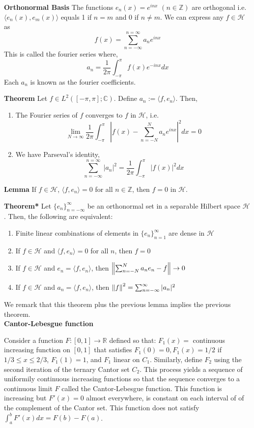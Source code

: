 \documentclass[6pt,landscape]{article}
\begin{document}
\begin{multicols*}{3}
\textbf{Orthonormal Basis} The functions $e_n(x) = e^{inx}$ $(n\in\mathbb{Z})$ are orthogonal i.e. $\langle e_n(x), e_m(x)\rangle$ equals 1 if $n=m$ and 0 if $n\neq m$. We can express any
$f\in\mathcal{H}$ as
\[ f(x) = \sum_{n=-\infty}^{n=\infty} a_ne^{inx} \]
This is called the fourier series where,
\[ a_n = \frac{1}{2\pi}\int_{-\pi}^{\pi} f(x)e^{-inx}dx \]
Each $a_n$ is known as the fourier coefficients.

\textbf{Theorem} Let $f\in L^2([-\pi,\pi]; \mathbb{C})$. Define $a_n := \langle f,e_n\rangle$. Then,
\begin{enumerate}
	\item The Fourier series of $f$ converges to $f$ in $\mathcal{H}$, i.e. \[ \lim_{N\to\infty} \frac{1}{2\pi} \int_{-\pi}^{\pi} |f(x) - \sum_{n=-N}^{N} a_ne^{inx}|^2dx = 0 \]
	\item We have Parseval's identity, \[\sum_{n=-\infty}^{n=\infty} |a_n|^2 = \frac{1}{2\pi}\int_{-\pi}^{\pi} |f(x)|^2dx \]
\end{enumerate}

\textbf{Lemma} If $f\in\mathcal{H}$, $\langle f,e_n\rangle = 0$ for all $n\in\mathbb{Z}$, then $f=0$ in $\mathcal{H}$.

\textbf{Theorem*} Let $\{e_n\}_{n=-\infty}^{\infty}$ be an orthonormal set in a separable Hilbert space $\mathcal{H}$. Then, the following are equivalent:
\begin{enumerate}
	\item Finite linear combinations of elements in $\{e_n\}_{n=1}^{\infty}$ are dense in $\mathcal{H}$
	\item If $f\in\mathcal{H}$ and $\langle f,e_n\rangle = 0$ for all $n$, then $f=0$
	\item If $f\in\mathcal{H}$ and $e_n = \langle f,e_n\rangle$, then $\left\lVert\sum_{n=-N}^N a_ne_n - f\right\rVert \to 0$
	\item If $f\in\mathcal{H}$ and $a_n = \langle f,e_n\rangle$, then $\left\lVert f\right\rVert^2 = \sum_{n=-\infty}^{\infty} |a_n|^2$
\end{enumerate}
We remark that this theorem plus the previous lemma implies the previous theorem.\\

\textbf{Cantor-Lebesgue function}

Consider a function $F: [0,1]\to\mathbb{R}$ defined so that: $F_1(x) =$ continuous increasing function on $[0,1]$ that satisfies $F_1(0) = 0, F_1(x) = 1/2$ if $1/3\leq x \leq 2/3$, $F_1(1) = 1$, and
$F_1$ linear on $C_1$. Similarly, define $F_2$ using the second iteration of the ternary Cantor set $C_2$. This process yields a sequence of uniformily continuous increasing functions so that the
sequence converges to a continuous limit $F$ called the Cantor-Lebesgue function. This function is increasing but $F'(x)=0$ almost everywhere, is constant on each interval of of the complement
of the Cantor set. This function does not satisfy $\int_a^b F'(x)dx = F(b) - F(a)$.

\end{multicols*}
\end{document}
